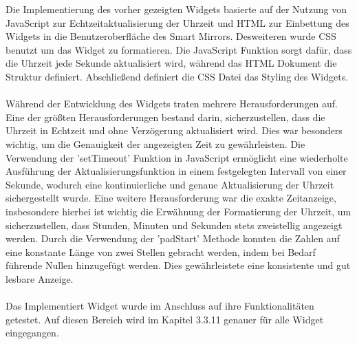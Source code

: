 \noindent
Die Implementierung des vorher gezeigten Widgets basierte auf der Nutzung von JavaScript zur Echtzeitaktualisierung der Uhrzeit und HTML zur Einbettung des Widgets in die Benutzeroberfläche des Smart Mirrors. Desweiteren wurde CSS benutzt um das Widget zu formatieren. Die JavaScript Funktion sorgt dafür, dass die Uhrzeit jede Sekunde aktualisiert wird, während das HTML Dokument die Struktur definiert. Abschließend definiert die CSS Datei das Styling des Widgets. \\ \\
\noindent
Während der Entwicklung des Widgets traten mehrere Herausforderungen auf. Eine der größten Herausforderungen bestand darin, sicherzustellen, dass die Uhrzeit in Echtzeit und ohne Verzögerung aktualisiert wird. Dies war besonders wichtig, um die Genauigkeit der angezeigten Zeit zu gewährleisten. Die Verwendung der 'setTimeout' Funktion in JavaScript ermöglicht eine wiederholte Ausführung der Aktualisierungsfunktion in einem festgelegten Intervall von einer Sekunde, wodurch eine kontinuierliche und genaue Aktualisierung der Uhrzeit sichergestellt wurde.
Eine weitere Herausforderung war die exakte Zeitanzeige, insbesondere hierbei ist wichtig die Erwähnung der Formatierung der Uhrzeit, um sicherzustellen, dass Stunden, Minuten und Sekunden stets zweistellig angezeigt werden. Durch die Verwendung der 'padStart' Methode konnten die Zahlen auf eine konstante Länge von zwei Stellen gebracht werden, indem bei Bedarf führende Nullen hinzugefügt werden. Dies gewährleistete eine konsistente und gut lesbare Anzeige.\\ \\
\noindent
Das Implementiert Widget wurde im Anschluss auf ihre Funktionalitäten getestet. Auf diesen Bereich wird im Kapitel 3.3.11 genauer für alle Widget eingegangen.


